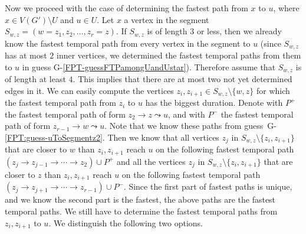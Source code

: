\documentclass[a4paper,UKenglish,cleveref, autoref, thm-restate]{lipics-v2021}
\begin{document}
Now we proceed with the case of determining the fastest path from $x$ to $u$, where $x \in V(G') \setminus U$ and $u \in U$.
Let $x$ a vertex in the segment $S_{w,z} = (w=z_1,z_2, \dots, z_r = z)$.
If $S_{w,z}$ is of length $3$ or less, then we already know the fastest temporal path from every vertex in the segment to $u$ 
(since $S_{w,z}$ has at most $2$ inner vertices, we determined the fastest temporal paths from them to $u$ in guess G-\ref{FPT-guessFTPamongUandUstar}).
Therefore assume that $S_{w,z}$ is of length at least $4$.
This implies that there are at most two not yet determined edges in it.
We can easily compute the vertices $z_i, z_{i+1} \in S_{w,z}\setminus\{w,z\}$ for which the fastest temporal path from $z_i$ to $u$ has the biggest duration.
Denote with $P^+$ the fastest temporal path of form $z_2 \rightarrow z \leadsto u$,
and with $P^-$ the fastest temporal path of form $z_{r-1} \rightarrow w \leadsto u$.
Note that we know these paths from guess~G-\ref{FPT:guess-uToSegmentz2}.
Then we know that all vertices $z_j$ in $S_{w,z} \setminus\{z_i,z_{i+1}\}$ that are closer to $w$ than $z_i,z_{i+1}$ reach $u$ on the 
following fastest temporal path $(z_j \rightarrow z_{j-1} \rightarrow \cdots \rightarrow z_2) \cup P^+$ 
and
all the vertices $z_j$ in $S_{w,z}\setminus\{z_i,z_{i+1}\}$ that are closer to $z$ than $z_i, z_{i+1}$ reach $u$ on the 
following fastest temporal path
$(z_j \rightarrow z_{j+1} \rightarrow \cdots \rightarrow z_{r-1}) \cup P^-$.
Since the first part of fastest paths is unique, and we know the second part is the fastest, the above paths are the fastest temporal paths.
We still have to determine the fastest temporal paths from $z_i,z_{i+1}$ to $u$.
We distinguish the following two options.
\end{document}
